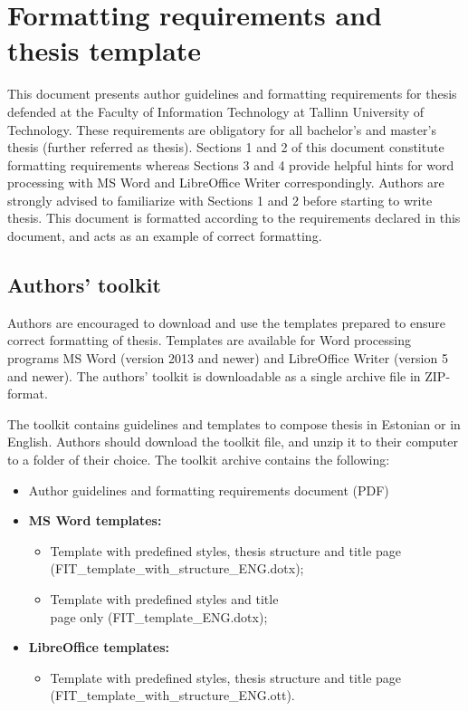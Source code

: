 \section{Formatting requirements and thesis template}
\label{Introduction} %

This document presents author guidelines and formatting requirements for thesis defended at the Faculty of Information Technology at Tallinn University of Technology. These requirements are obligatory for all bachelor’s and master’s thesis (further referred as thesis). Sections 1 and 2 of this document constitute formatting requirements whereas Sections 3 and 4 provide helpful hints for word processing with MS Word and LibreOffice Writer correspondingly. Authors are strongly advised to familiarize with Sections 1 and 2 before starting to write thesis. This document is formatted according to the requirements declared in this document, and acts as an example of correct formatting.

\subsection{Authors’ toolkit}

Authors are encouraged to download and use the templates prepared to ensure correct formatting of thesis. Templates are available for Word processing programs MS Word (version 2013 and newer) and LibreOffice Writer (version 5 and newer). The authors’ toolkit is downloadable as a single archive file in ZIP-format.

The toolkit contains guidelines and templates to compose thesis in Estonian or in English. Authors should download the toolkit file, and unzip it to their computer to a folder of their choice. The toolkit archive contains the following:

\begin{itemize}
    \item  Author guidelines and formatting requirements document (PDF)  
    \item \textbf{MS Word templates:}
    	\begin{itemize}
          \item Template with predefined styles, thesis 
          		structure and title page \\
                (FIT\_template\_with\_structure\_ENG.dotx);
          \item Template with predefined styles and title \\
          		page only (FIT\_template\_ENG.dotx);
    	\end{itemize}
    \item \textbf{LibreOffice templates:}
     	\begin{itemize}
            \item Template with predefined styles, thesis 
            	  structure and title page \\
                  (FIT\_template\_with\_structure\_ENG.ott).
      	\end{itemize}
\end{itemize}

